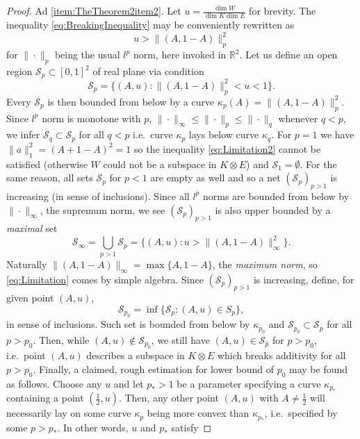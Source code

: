 \documentclass[reqno]{amsart}
\theoremstyle{plain}
\theoremstyle{note}
\newcommand{\reals}{\mathbb{R}}
\begin{document}
\begin{proof}
Ad \ref{item:TheTheorem2item2}. Let $u = \frac{\dim{W}}{\dim{K}\dim{E}}$ for brevity. The inequality \ref{eq:BreakingInequality} may be conveniently rewritten as
\begin{equation}\label{eq:Limitation2}
    u > \| (A, 1-A) \|_{p}^{2}
\end{equation}
for $\| \cdot \|_p$ being the usual $l^p$ norm, here invoked in $\reals^2$. Let us define an open region $\mathcal{S}_p \subset [0,1]^2$ of real plane via condition
\begin{equation}
    \mathcal{S}_p = \{ (A, u) : \| (A, 1-A) \|_{p}^{2} < u < 1\}.
\end{equation}
Every $\mathcal{S}_p$ is then bounded from below by a curve $\kappa_p (A) = \| (A, 1-A) \|_{p}^{2}$. Since $l^p$ norm is monotone with $p$, $\|\cdot\|_\infty \leqslant \| \cdot \|_p \leqslant \| \cdot \|_q$ whenever $q < p$, we infer $\mathcal{S}_q \subset \mathcal{S}_p$ for all $q < p$ i.e.~curve $\kappa_p$ lays below curve $\kappa_q$. For $p = 1$ we have $\| a \|_{1}^{2} = (A + 1 - A)^2 = 1$ so the inequality \eqref{eq:Limitation2} cannot be satisfied (otherwise $W$ could not be a subspace in $K\otimes E$) and $\mathcal{S}_1 = \emptyset$. For the same reason, all sets $\mathcal{S}_p$ for $p < 1$ are empty as well and so a net $(\mathcal{S}_p)_{p > 1}$ is increasing (in sense of inclusions). Since all $l^p$ norms are bounded from below by $\|\cdot\|_\infty$, the supremum norm, we see $(\mathcal{S}_p)_{p>1}$ is also upper bounded by a \emph{maximal} set
\begin{equation}
    \mathcal{S}_\infty = \bigcup_{p>1} \mathcal{S}_p = \{(A,u) : u > \| (A, 1-A) \|_{\infty}^{2}\}.
\end{equation}
Naturally $\| (A, 1-A)\|_{\infty} = \max{\{A, 1-A\}}$, the \emph{maximum norm}, so \eqref{eq:Limitation} comes by simple algebra. Since $(\mathcal{S}_p)_{p>1}$ is increasing, define, for given point $(A,u)$,
\begin{equation}
    \mathcal{S}_{p_0} = \inf\{\mathcal{S}_p : (A,u)\in S_p\},
\end{equation}
in sense of inclusions. Such set is bounded from below by $\kappa_{p_0}$ and $\mathcal{S}_{p_0} \subset \mathcal{S}_{p}$ for all $p > p_0$. Then, while $(A,u) \notin \mathcal{S}_{p_0}$, we still have $(A,u) \in \mathcal{S}_{p}$ for $p > p_0$, i.e.~point $(A,u)$ describes a subspace in $K\otimes E$ which breaks additivity for all $p>p_0$. Finally, a claimed, rough estimation for lower bound of $p_0$ may be found as follows. Choose any $u$ and let $p_* > 1$ be a parameter specifying a curve $\kappa_{p_*}$ containing a point $(\frac{1}{2},u)$. Then, any other point $(A, u)$ with $A\neq\frac{1}{2}$ will necessarily lay on some curve $\kappa_p$ being more convex than $\kappa_{p_*}$, i.e.~specified by some $p > p_*$. In other words, $u$ and $p_*$ satisfy

\end{proof}
\end{document}
